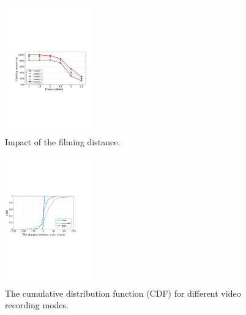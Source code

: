         \begin{figure}[t!]
            \centering
            \includegraphics[width=0.35\textwidth]{fig/12.pdf}
            \vspace{-3mm}
            \caption{Impact of the filming distance.}
            \label{fig:fig12}
           \vspace{-3mm}
        \end{figure}

\begin{figure}[t!]
    \centering
    \includegraphics[width=0.35\textwidth]{fig/13.pdf}
    \vspace{-2mm}
    \caption{The cumulative distribution function (CDF) for different video recording modes.}
    \vspace{-2mm}
    \label{fig:fig13}
\end{figure}


